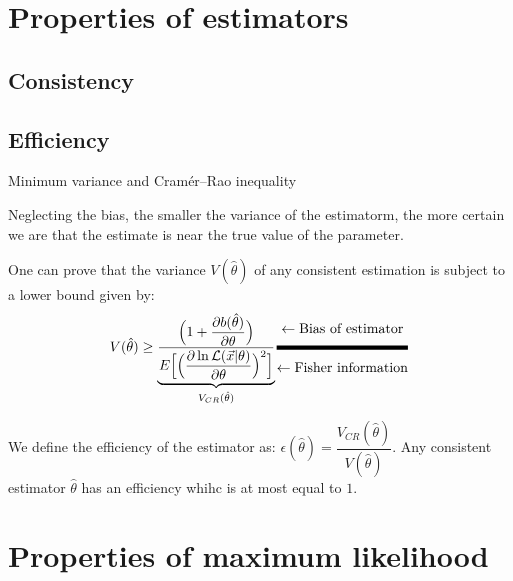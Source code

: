 

\section{Properties of estimators}
\label{sec:point_estimation_prop_of_estimator}

\subsection{Consistency}
\label{subsec:prop_of_estimator_consistency}

\subsection{Efficiency}
\label{subsec:prop_of_estimator_efficiency} Minimum variance and Cramér–Rao inequality

Neglecting the bias, the smaller the variance of the estimatorm, the more certain we are that the estimate is near the true value of the parameter. 

One can prove that the variance $V(\hat{\theta})$ of any consistent estimation is subject to a lower bound given by:
\begin{align}
    V(\hat{\theta}) \geq \underset{V_{CR}(\hat{\theta})}{\underbrace{\dfrac{\Big ( 1 + \dfrac{\partial b(\hat{\theta})}{\partial \theta} \Big )}{E \Big [ \Big ( \dfrac{\partial \ln{\mathcal{L}(\vec{x}|\theta)}}{\partial \theta} \Big )^2 \Big]}}} \genfrac{}{}{3pt}{}{\leftarrow {\text{Bias of estimator}}}{\leftarrow \text{Fisher information}} 
\end{align}

We define the efficiency of the estimator as: $\epsilon(\hat{\theta}) = \dfrac{V_{CR}(\hat\theta)}{V(\hat{\theta})}$. 
Any consistent estimator $\hat{\theta}$ has an efficiency whihc is at most equal to $1$.

\section{Properties of maximum likelihood}
\label{sec:point_estimation_prop_of_max_likelihood}

